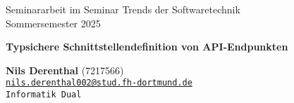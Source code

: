 \documentclass{article}
\begin{document}
\begin{titlepage}
    \begin{center}
        \vspace*{1cm}

        \LARGE Seminararbeit im Seminar Trends der Softwaretechnik \\
        \large Sommersemester 2025

        \vspace{1.5cm}

        \huge
        \textbf{Typsichere Schnittstellendefinition von API-Endpunkten}

        \vspace{3cm}

        \large
        \textbf{Nils Derenthal} (7217566) \\
        \def\email{nils.derenthal002@stud.fh-dortmund.de}\tt\href{mailto:\email}{\email} \\
        Informatik Dual

        \vfill
    \end{center}
\end{titlepage}

\tableofcontents

\newpage







\end{document}
